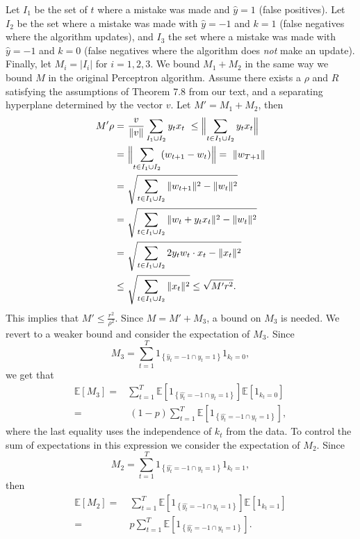 \documentclass[12pt]{article}
\newcommand{\E}[0]{\mathbb{E}}
\begin{document}
Let $I_1$ be the set of $t$ where a mistake was made and
$\widehat{y}=1$ (false positives).  Let $I_2$ be the set where a mistake was made with
$\widehat{y} = -1$ and $k = 1$ (false negatives where the algorithm updates), and $I_3$ the set where a mistake was
made with $\widehat{y} = -1$ and $k = 0$ (false negatives where the algorithm does {\it not} make an update). Finally, let $M_i = |I_i|$ for $i =
1,2,3$. We bound $M_1 + M_2$ in the same way we bound $M$ in the original Perceptron algorithm. Assume there exists a $\rho$ and $R$ satisfying the assumptions of Theorem 7.8 from our text, and a separating hyperplane determined by the vector $v$. Let $M' = M_1 + M_2$, then
\begin{align*}
M' \rho =&\ \frac{v}{\|v\|}\sum_{I_1 \cup I_2} y_tx_t \
 \leq   \Bigl\|\sum_{t \in I_1 \cup I_2} y_t x_t\Bigr\| \\
=& \ \Bigl\|\sum_{t \in I_1 \cup I_2} (w_{t+1} - w_t) \Bigr\| 
= \ \|w_{T+1} \| \\
=&\ \sqrt{\sum_{t \in I_1 \cup I_2} \|  w_{t+1}\|^2 - \|w_t\|^2 }\\
= &\ \sqrt{\sum_{t \in I_1 \cup I_2} \|  w_{t} + y_t x_t\|^2 - \|w_t\|^2 }\\
= &\ \sqrt{\sum_{t \in I_1 \cup I_2} 2y_t w_t\cdot x_t - \|x_t\|^2} \\
\leq &\ \sqrt{\sum_{t \in I_1 \cup I_2} \|x_t\|^2}
\leq \sqrt{M'r^2}.
\end{align*}
This implies that $M' \leq \frac{r^2}{\rho^2}$. Since $M = M' + M_3$, a bound on $M_3$ is needed. We revert to a weaker bound and consider the expectation of
$M_3$. Since 
\[M_3 = \sum_{t=1}^T 1_{\left\{\widehat{y}_t = -1 \cap y_t = 1\right\}}1_{k_t = 0}, \]
we get that
\begin{align*}
\E[M_3] = & \sum_{t=1}^T \E[1_{\left\{\widehat{y_t} = -1 \cap y_t = 1\right\}}]\E[1_{k_t = 0}] \\
 = &\ (1 - p)\sum_{t=1}^T \E[1_{\left\{\widehat{y_t} = -1 \cap y_t = 1\right\}}],
\end{align*}
where the last equality uses the independence of $k_t$ from the data. To control the sum of expectations in this expression we consider the expectation of $M_2$. Since
\[
M_2 =  \sum_{t=1}^T 1_{\left\{\hat{y_t} = -1 \cap y_t = 1\right\}}1_{k_t = 1},
\]
then
\begin{align*}
\E[M_2] =&\ \sum_{t=1}^T \E[1_{\left\{\hat{y_t} = -1 \cap y_t = 1\right\}}]\E[1_{k_t = 1}] \\
=&\ p\sum_{t=1}^T \E[1_{\left\{\hat{y_t} = -1 \cap y_t = 1\right\}}].
\end{align*}
\end{document}

